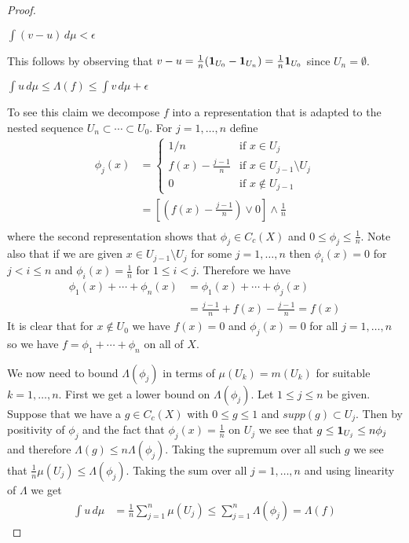 \begin{proof}
\begin{clm}$\int (v -u) \, d\mu < \epsilon$
\end{clm}

This follows by observing that $v - u = \frac{1}{n}
(\textbf{1}_{U_0} - \textbf{1}_{U_n}) = \frac{1}{n}
\textbf{1}_{U_0}$ since $U_n = \emptyset$.

\begin{clm}$\int u \, d\mu \leq \Lambda(f) \leq \int v \, d\mu + \epsilon$
\end{clm}

To see this claim we decompose $f$ into a representation that is
adapted to the nested sequence $U_n \subset \dotsb \subset U_0$.  For
$j=1, \dotsc, n$ define 
\begin{align*}
\phi_j(x) &= \begin{cases}
1/n & \text{if $x \in U_j$} \\
f(x) - \frac{j-1}{n} & \text{if $x \in U_{j-1} \setminus U_{j}$} \\
0 & \text{if $x \notin U_{j-1}$}
\end{cases} \\
&=[(f(x) - \frac{j-1}{n}) \vee 0] \wedge \frac{1}{n}\\
\end{align*}
where the second representation shows that $\phi_j \in C_c(X)$ and $0 \leq \phi_j \leq \frac{1}{n}$.
Note also
that if we are given $x \in U_{j-1} \setminus U_j$ for some $j=1,
\dotsc, n$ then $\phi_i(x) = 0$ for $j < i \leq n$ and $\phi_i(x) =
\frac{1}{n}$ for $1 \leq i < j$.  Therefore we have 
\begin{align*}
\phi_1(x) + \dotsb + \phi_n(x) &= \phi_1(x) + \dotsb + \phi_j(x) \\
&= \frac{j-1}{n} + f(x) - \frac{j-1}{n} = f(x)
\end{align*}
It is clear that for $x \notin U_0$ we have $f(x) = 0$ and
$\phi_j(x) = 0$ for all $j=1, \dotsc, n$ so we have
 $f = \phi_1 + \dotsb + \phi_n$ on all of $X$.

We now need to bound $\Lambda(\phi_j)$ in terms of $\mu(U_k) = m(U_k)$ for
suitable $k=1, \dotsc, n$.  First we get a lower bound on
$\Lambda(\phi_j)$.  Let $1 \leq j \leq n$ be given.  Suppose that we have a $g \in C_c(X)$ with
$0 \leq g \leq 1$ and $supp(g) \subset U_j$.  Then by positivity of
$\phi_j$ and the fact that $\phi_j(x) = \frac{1}{n}$ on $U_j$ we see
that $g \leq \textbf{1}_{U_j} \leq n \phi_j$ and therefore
$\Lambda(g) \leq n \Lambda(\phi_j)$.    Taking the supremum over all
such $g$ we see that $\frac{1}{n} \mu(U_j) \leq \Lambda(\phi_j)$.  Taking the
sum over all $j=1, \dotsc, n$ and using linearity of $\Lambda$ we get
\begin{align*}
\int u \, d\mu &= \frac{1}{n} \sum_{j=1}^n \mu(U_j) \leq \sum_{j=1}^n
\Lambda(\phi_j) = \Lambda(f)
\end{align*}


\end{proof}
